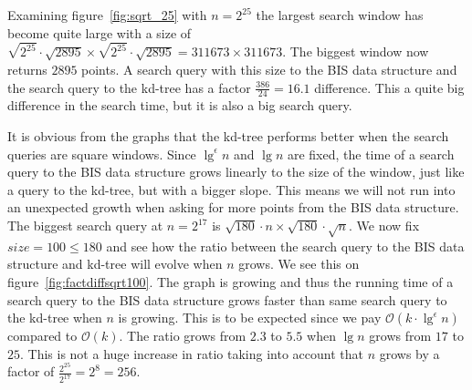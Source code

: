 
Examining figure~\ref{fig:sqrt_25} with $n = 2^{25}$ the largest search window has become quite large with a size of $\sqrt{2^{25}}\cdot\sqrt{2895} \times \sqrt{2^{25}}\cdot\sqrt{2895} = 311673 \times 311673$. The biggest window now returns $2895$ points. A search query with this size to the BIS data structure and the search query to the kd-tree has a factor $\frac{386}{24} = 16.1$ difference. This a quite big difference in the search time, but it is also a big search query.

It is obvious from the graphs that the kd-tree performs better when the search queries are square windows. Since $\lg^\epsilon n$ and $\lg n$ are fixed, the time of a search query to the BIS data structure grows linearly to the size of the window, just like a query to the kd-tree, but with a bigger slope. This means we will not run into an unexpected growth when asking for more points from the BIS data structure. \\

The biggest search query at $n = 2^{17}$ is $\sqrt{180}\cdot{n} \times \sqrt{180}\cdot\sqrt{n}$. We now fix $size = 100 \leq 180$ and see how the ratio between the search query to the BIS data structure and kd-tree will evolve when $n$ grows. We see this on figure~\ref{fig:factdiffsqrt100}. The graph is growing and thus the running time of a search query to the BIS data structure grows faster than same search query to the kd-tree when $n$ is growing. This is to be expected since we pay $\mathcal{O}(k\cdot\lg^\epsilon n)$ compared to $\mathcal{O}(k)$. The ratio grows from $2.3$ to $5.5$ when $\lg n$ grows from $17$ to $25$. This is not a huge increase in ratio taking into account that $n$ grows by a factor of $\frac{2^{25}}{2^{17}} = 2^8 = 256$.

